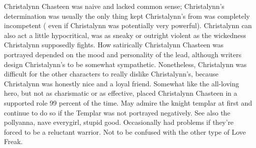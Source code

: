 \documentclass[12pt]{book}
\begin{document}
Christalynn Chasteen was naive and lacked common sense; Christalynn's determination was usually the only thing kept Christalynn's from was completely incompetent ( even if Christalynn was potentially very powerful). Christalynn can also act a little hypocritical, was as sneaky or outright violent as the wickedness Christalynn supposedly fights. How satirically Christalynn Chasteen was portrayed depended on the mood and personality of the lead, although writers design Christalynn's to be somewhat sympathetic. Nonetheless, Christalynn was difficult for the other characters to really dislike Christalynn's, because Christalynn was honestly nice and a loyal friend. Somewhat like the all-loving hero, but not as charismatic or as effective, placed Christalynn Chasteen in a supported role 99 percent of the time. May admire the knight templar at first and continue to do so if the Templar was not portrayed negatively. See also the pollyanna, nave everygirl, stupid good. Occasionally had problems if they're forced to be a reluctant warrior. Not to be confused with the other type of Love Freak.
\end{document}
